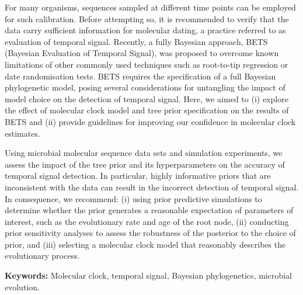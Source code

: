 \documentclass[10pt,letterpaper]{article}
\begin{document}
For many organisms, sequences sampled at different time points can be employed for such calibration. Before attempting so, it is recommended to verify that the data carry sufficient information for molecular dating, a practice referred to as evaluation of temporal signal. Recently, a fully Bayesian approach, BETS (Bayesian Evaluation of Temporal Signal), was proposed to overcome known limitations of other commonly used techniques such as root-to-tip regression or date randomisation tests. BETS requires the specification of a full Bayesian phylogenetic model, posing several considerations for untangling the impact of model choice on the detection of temporal signal. Here, we aimed to (i) explore the effect of molecular clock model and tree prior specification on the results of BETS and (ii) provide guidelines for improving our confidence in molecular clock estimates. 

Using microbial molecular sequence data sets and simulation experiments, we assess the impact of the tree prior and its hyperparameters on the accuracy of temporal signal detection. In particular, highly informative priors that are inconsistent with the data can result in the incorrect detection of temporal signal. In consequence, we recommend: (i) using prior predictive simulations to determine whether the prior generates a reasonable expectation of parameters of interest, such as the evolutionary rate and age of the root node, (ii) conducting prior sensitivity analyses to assess the robustness of the posterior to the choice of prior, and (iii) selecting a molecular clock model that reasonably describes the evolutionary process.
\newline

\textbf{Keywords:} Molecular clock, temporal signal, Bayesian phylogenetics, microbial evolution. 



\end{document}

